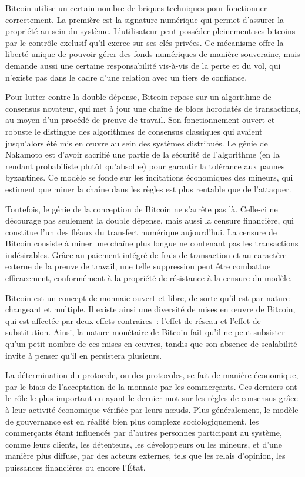 Bitcoin utilise un certain nombre de briques techniques pour fonctionner correctement. La première est la signature numérique qui permet d'assurer la propriété au sein du système. L'utilisateur peut posséder pleinement ses bitcoins par le contrôle exclusif qu'il exerce sur ses clés privées. Ce mécanisme offre la liberté unique de pouvoir gérer des fonds numériques de manière souveraine, mais demande aussi une certaine responsabilité vis-à-vis de la perte et du vol, qui n'existe pas dans le cadre d'une relation avec un tiers de confiance.

Pour lutter contre la double dépense, Bitcoin repose sur un algorithme de consensus novateur, qui met à jour une chaîne de blocs horodatés de transactions, au moyen d'un procédé de preuve de travail. Son fonctionnement ouvert et robuste le distingue des algorithmes de consensus classiques qui avaient jusqu'alors été mis en œuvre au sein des systèmes distribués. Le génie de Nakamoto est d'avoir sacrifié une partie de la sécurité de l'algorithme (en la rendant probabiliste plutôt qu'absolue) pour garantir la tolérance aux pannes byzantines. Ce modèle se fonde sur les incitations économiques des mineurs, qui estiment que miner la chaîne dans les règles est plus rentable que de l'attaquer.

Toutefois, le génie de la conception de Bitcoin ne s'arrête pas là. Celle-ci ne décourage pas seulement la double dépense, mais aussi la censure financière, qui constitue l'un des fléaux du transfert numérique aujourd'hui. La censure de Bitcoin consiste à miner une chaîne plus longue ne contenant pas les transactions indésirables. Grâce au paiement intégré de frais de transaction et au caractère externe de la preuve de travail, une telle suppression peut être combattue efficacement, conformément à la propriété de résistance à la censure du modèle. %

Bitcoin est un concept de monnaie ouvert et libre, de sorte qu'il est par nature changeant et multiple. Il existe ainsi une diversité de mises en œuvre de Bitcoin, qui est affectée par deux effets contraires~: l'effet de réseau et l'effet de substitution. Ainsi, la nature monétaire de Bitcoin fait qu'il ne peut subsister qu'un petit nombre de ces mises en œuvres, tandis que son absence de scalabilité invite à penser qu'il en persistera plusieurs.

La détermination du protocole, ou des protocoles, se fait de manière économique, par le biais de l'acceptation de la monnaie par les commerçants. Ces derniers ont le rôle le plus important en ayant le dernier mot sur les règles de consensus grâce à leur activité économique vérifiée par leurs nœuds. Plus généralement, le modèle de gouvernance est en réalité bien plus complexe sociologiquement, les commerçants étant influencés par d'autres personnes participant au système, comme leurs clients, les détenteurs, les développeurs ou les mineurs, et d'une manière plus diffuse, par des acteurs externes, tels que les relais d'opinion, les puissances financières ou encore l'État.

